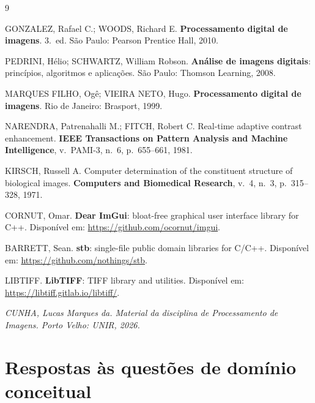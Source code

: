 \documentclass[11pt,a4paper]{article}
\newcommand{\placeholder}[1]{\textcolor{muted}{\textit{#1}}}
\begin{document}
\begin{thebibliography}{9}

GONZALEZ, Rafael C.; WOODS, Richard E. \textbf{Processamento digital de imagens}. 3.~ed.
São Paulo: Pearson Prentice Hall, 2010.

PEDRINI, Hélio; SCHWARTZ, William Robson. \textbf{Análise de imagens digitais}: princípios,
algoritmos e aplicações. São Paulo: Thomson Learning, 2008.

MARQUES FILHO, Ogê; VIEIRA NETO, Hugo. \textbf{Processamento digital de imagens}. Rio de
Janeiro: Brasport, 1999.

NARENDRA, Patrenahalli M.; FITCH, Robert C. Real-time adaptive contrast enhancement.
\textbf{IEEE Transactions on Pattern Analysis and Machine Intelligence}, v.~PAMI-3, n.~6,
p.~655--661, 1981.

KIRSCH, Russell A. Computer determination of the constituent structure of biological images.
\textbf{Computers and Biomedical Research}, v.~4, n.~3, p.~315--328, 1971.

CORNUT, Omar. \textbf{Dear ImGui}: bloat-free graphical user interface library for C++.
Disponível em: \url{https://github.com/ocornut/imgui}.

BARRETT, Sean. \textbf{stb}: single-file public domain libraries for C/C++. Disponível em:
\url{https://github.com/nothings/stb}.

LIBTIFF. \textbf{LibTIFF}: TIFF library and utilities. Disponível em:
\url{https://libtiff.gitlab.io/libtiff/}.

\placeholder{CUNHA, Lucas Marques da. Material da disciplina de Processamento de Imagens.
Porto Velho: UNIR, 2026.}

\end{thebibliography}

\appendix
\section{Respostas às questões de domínio conceitual}
\label{ap:questoes}
\end{document}
